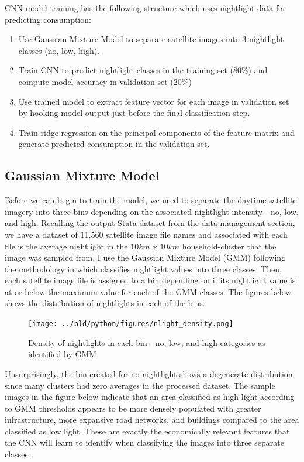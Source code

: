 \documentclass[11pt, a4paper, leqno]{article}
\begin{document}
CNN model training has the following structure which uses nightlight data for predicting consumption:

\begin{enumerate}
	\item Use Gaussian Mixture Model to separate satellite images into 3 nightlight classes (no, low, high).
	\item Train CNN to predict nightlight classes in the training set (80\%) and compute model accuracy in validation set (20\%)
	\item Use trained model to extract feature vector for each image in validation set by hooking model output just before the final classification step.
	\item Train ridge regression on the principal components of the feature matrix and generate predicted consumption in the validation set.
\end{enumerate}

\subsection{Gaussian Mixture Model}

Before we can begin to train the model, we need to separate the daytime satellite imagery into three bins depending on the associated nightlight intensity - no, low, and high. Recalling the output Stata dataset from the data management section, we have a dataset of 11,560 satellite image file names and associated with each file is the average nightlight in the $10km$ x $10km$ household-cluster that the image was sampled from. I use the Gaussian Mixture Model (GMM) following the methodology in \citet{jean2016combining} which classifies nightlight values into three classes. Then, each satellite image file is assigned to a bin depending on if its nightlight value is at or below the maximum value for each of the GMM classes. The figures below shows the distribution of nightlights in each of the bins.

\begin{figure}[H]

\centering
    \texttt{[image: ../bld/python/figures/nlight\_density.png]}
    \caption{Density of nightlights in each bin - no, low, and high categories as identified by GMM.}
    \label{fig:python-predictions}

\end{figure}

 Unsurprisingly, the bin created for no nightlight shows a degenerate distribution since many clusters had zero averages in the processed dataset. The sample images in the figure below indicate that an area classified as high light according to GMM thresholds appears to be more densely populated with greater infrastructure, more expansive road networks, and buildings compared to the area classified as low light. These are exactly the economically relevant features that the CNN will learn to identify when classifying the images into three separate classes. 
\end{document}
